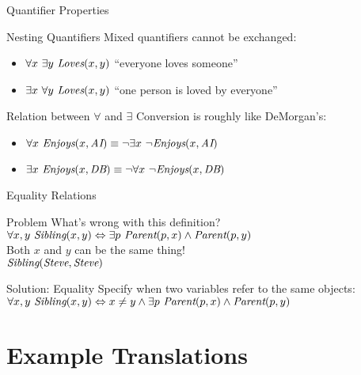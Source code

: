 \documentclass[12pt]{beamer}
\newcommand{\EM}[1]{\mbox{\em#1}}
\newcommand{\tab}{\hspace{1em}}
\newcommand{\liff}{\Leftrightarrow}
\begin{document}
\begin{frame}{Quantifier Properties}
	\begin{block}{Nesting Quantifiers}
		Mixed quantifiers cannot be exchanged:
		\begin{itemize}
			\item $\forall x\ \exists y\ \EM{Loves}(x, y)$ ``everyone loves someone''
			\item $\exists x\ \forall y\ \EM{Loves}(x, y)$ ``one person is loved by everyone''
		\end{itemize}
	\end{block}
	\pause
	\begin{block}{Relation between $\forall$ and $\exists$}
		Conversion is roughly like DeMorgan's:
		\begin{itemize}
			\item $\forall x\ \EM{Enjoys}(x, \EM{AI}) \equiv \lnot\exists x\ \lnot \EM{Enjoys}(x, \EM{AI})$
			\item $\exists x\ \EM{Enjoys}(x, \EM{DB}) \equiv \lnot\forall x\ \lnot \EM{Enjoys}(x, \EM{DB})$
		\end{itemize}
	\end{block}
\end{frame}
\begin{frame}{Equality Relations}
	\begin{block}{Problem}
		What's wrong with this definition? \\
		\tab$\forall x, y\ \EM{Sibling}(x, y) \liff \exists p\ \EM{Parent}(p, x) \land \EM{Parent}(p, y)$ \\[1em]
		\pause
		Both $x$ and $y$ can be the same thing! \\
		\tab$\EM{Sibling}(\EM{Steve}, \EM{Steve})$
	\end{block}
	\pause
	\begin{block}{Solution: Equality}
		Specify when two variables refer to the same objects: \\[.5em]
		$\forall x, y\ \EM{Sibling}(x, y) \liff x \neq y \land \exists p\ \EM{Parent}(p, x) \land \EM{Parent}(p, y)$
	\end{block}
\end{frame}

\section{Example Translations}
\end{document}
